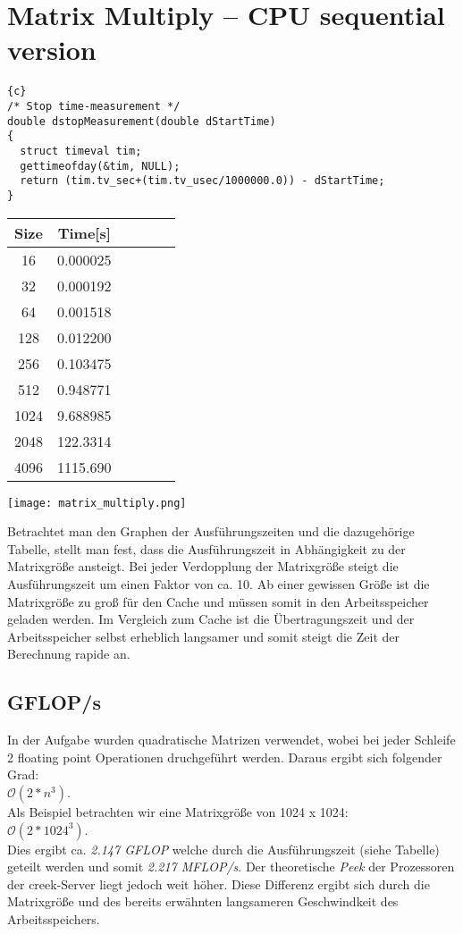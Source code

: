 \documentclass{article}
\newcommand{\enterProblemHeader}[1]{
}
\newcommand{\exitProblemHeader}[1]{
}
\newcounter{homeworkProblemCounter} %
\newcommand{\homeworkProblemName}{}
\newenvironment{homeworkProblem}[1][Problem \arabic{homeworkProblemCounter}]{ %
\stepcounter{homeworkProblemCounter} %
\renewcommand{\homeworkProblemName}{#1} %
\section{\homeworkProblemName} %
}{
}
\begin{document}
\begin{homeworkProblem}[Matrix Multiply – CPU sequential version]
\begin{lstlisting}{c}
/* Stop time-measurement */
double dstopMeasurement(double dStartTime)
{
  struct timeval tim;
  gettimeofday(&tim, NULL);
  return (tim.tv_sec+(tim.tv_usec/1000000.0)) - dStartTime;
}
\end{lstlisting}
\begin{center}
\begin{tabular}{ |c|c|c|c|c|c| } 
\hline
\hline
Size & Time[s] \\
\hline
16 & 0.000025 \\ 
\hline
32 & 0.000192 \\ 
\hline
64 & 0.001518 \\ 
\hline
128 & 0.012200 \\
\hline
256 & 0.103475 \\
\hline
512 & 0.948771 \\
\hline
1024 & 9.688985 \\
\hline
2048 & 122.3314 \\
\hline
4096 & 1115.690 \\
\hline
\hline
\end{tabular}
\end{center}
\begin{center}
\texttt{[image: matrix\_multiply.png]}
\end{center}
Betrachtet man den Graphen der Ausführungszeiten und die dazugehörige Tabelle, stellt man fest, dass die Ausführungszeit in Abhängigkeit zu der Matrixgröße ansteigt. Bei jeder Verdopplung der Matrixgröße steigt die Ausführungszeit um einen Faktor von ca. 10. Ab einer gewissen Größe ist die Matrixgröße zu groß für den Cache und müssen somit in den Arbeitsspeicher geladen werden. Im Vergleich zum Cache ist die Übertragungszeit und der Arbeitsspeicher selbst erheblich langsamer und somit steigt die Zeit der Berechnung rapide an.
\subsection{GFLOP/s}
In der Aufgabe wurden quadratische Matrizen verwendet, wobei bei jeder Schleife 2 floating point Operationen druchgeführt werden. Daraus ergibt sich folgender Grad: 
\\${\mathcal O (2*n^3)}$. \\
Als Beispiel betrachten wir eine Matrixgröße von 1024 x 1024:
\\${\mathcal O (2*1024^3)}$. \\
Dies ergibt ca. \textit{2.147 GFLOP} welche durch die Ausführungszeit (siehe Tabelle) geteilt werden und somit \textit{2.217 MFLOP/s}.
Der theoretische \textit{Peek} der Prozessoren der creek-Server liegt jedoch weit höher. Diese Differenz ergibt sich durch die Matrixgröße und des bereits erwähnten langsameren Geschwindkeit des Arbeitsspeichers.
\end{homeworkProblem}
\pagebreak
\end{document}
